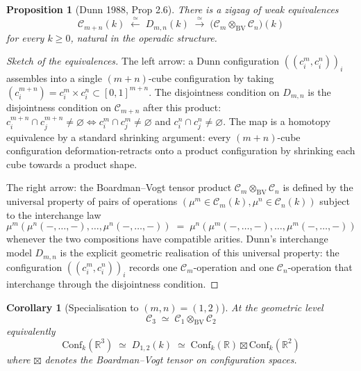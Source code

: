 \documentclass[11pt]{article}
\newtheorem{proposition}[theorem]{Proposition}
\newtheorem{corollary}[theorem]{Corollary}
\newcommand{\Cube}{\mathscr{C}}
\newcommand{\Conf}{\mathrm{Conf}}
\newcommand{\R}{\mathbb{R}}
\begin{document}
\begin{proposition}[Dunn 1988, Prop 2.6]
\label{prop:dunn-space-equivalence}
There is a zigzag of weak equivalences
\[
  \Cube_{m + n}(k) \;\xleftarrow{\;\simeq\;}\; D_{m, n}(k)
  \;\xrightarrow{\;\simeq\;}\; \bigl(\Cube_{m} \otimes_{\mathrm{BV}}
  \Cube_{n}\bigr)(k)
\]
for every $k \geq 0$, natural in the operadic structure.
\end{proposition}

\begin{proof}[Sketch of the equivalences]
The left arrow: a Dunn configuration $((c_{i}^{m}, c_{i}^{n}))_{i}$
assembles into a single $(m + n)$-cube configuration by taking
$(c_{i}^{m + n}) = c_{i}^{m} \times c_{i}^{n} \subset [0, 1]^{m + n}$.
The disjointness condition on $D_{m, n}$ is the disjointness condition
on $\Cube_{m + n}$ after this product: $c_{i}^{m + n} \cap c_{j}^{m + n}
\neq \varnothing \Longleftrightarrow c_{i}^{m} \cap c_{j}^{m} \neq
\varnothing$ and $c_{i}^{n} \cap c_{j}^{n} \neq \varnothing$. The map
is a homotopy equivalence by a standard shrinking argument: every
$(m + n)$-cube configuration deformation-retracts onto a product
configuration by shrinking each cube towards a product shape.

The right arrow: the Boardman--Vogt tensor product
$\Cube_{m} \otimes_{\mathrm{BV}} \Cube_{n}$ is defined by the universal
property of pairs of operations $(\mu^{m} \in \Cube_{m}(k), \mu^{n}
\in \Cube_{n}(k))$ subject to the interchange law
\[
  \mu^{m}(\mu^{n}(-, \ldots, -), \ldots, \mu^{n}(-, \ldots, -))
  \;=\; \mu^{n}(\mu^{m}(-, \ldots, -), \ldots, \mu^{m}(-, \ldots, -))
\]
whenever the two compositions have compatible arities. Dunn's
interchange model $D_{m, n}$ is the explicit geometric realisation
of this universal property: the configuration $((c_{i}^{m},
c_{i}^{n}))_{i}$ records one $\Cube_{m}$-operation and one
$\Cube_{n}$-operation that interchange through the disjointness
condition.
\end{proof}

\begin{corollary}[Specialisation to $(m, n) = (1, 2)$]
\label{cor:dunn-12}
At the geometric level
\[
  \Cube_{3} \;\simeq\; \Cube_{1} \otimes_{\mathrm{BV}} \Cube_{2}
\]
equivalently
\[
  \Conf_{k}(\R^{3}) \;\simeq\; D_{1, 2}(k) \;\simeq\;
  \Conf_{k}(\R) \boxtimes \Conf_{k}(\R^{2})
\]
where $\boxtimes$ denotes the Boardman--Vogt tensor on configuration
spaces.
\end{corollary}
\end{document}
